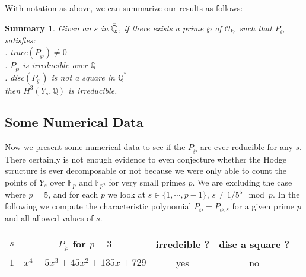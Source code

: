 \documentclass[12pt,titlepage]{article}
\newtheorem{summary}[lem]{Summary}
\begin{document}
With  notation as above, we can summarize our results as follows:
\begin{summary}
  Given an $s$ in $\Bar{\mathbb{Q}}$, if there exists a prime $\wp$ of
  $\mathcal{O}_{k_0}$ such that $P_{\wp}$ satisfies:\\ . trace$(P_{\wp}) \neq 0$\\ . $P_{\wp}$ is irreducible
  over $\mathbb{Q}$ \\ . disc$(P_{\wp})$ is not a square in
  $\mathbb{Q}^*$ \\ then $H^3(Y_{s}, \mathbb{Q})$ is
  irreducible.
\end{summary}
\subsection{Some Numerical Data}
Now we present some numerical data to see if the $P_{\wp}$ are ever
reducible for any $s$. There certainly is not enough evidence to even
conjecture whether the Hodge structure is ever decomposable or not
because we were only able to count the points of $Y_s$ over
$\mathbb{F}_p$ and $\mathbb{F}_{p^2}$ for very small primes $p$.  We
are excluding the case where $p=5$, and for each $p$ we look at $s \in
\{1, \cdots, p-1\}$, $s \neq 1/5^5 \mod p$. In the following we
compute the characteristic polynomial $P_{\wp}=P_{\wp,s}$ for a given
prime $p$ and all allowed values of $s$.
\begin{center}
\begin{tabular}{|c|c|c|c|}
\hline  $s$ & $P_{\wp}$ for $p=3$ & irredcible ?& disc a square ?
\\ \hline $1$ & $x^4  + 5 x^3 + 45 x^2  + 135 x + 729$ & yes & no

 \\ 

 \hline
\end{tabular}
\end{center}
\end{document}
